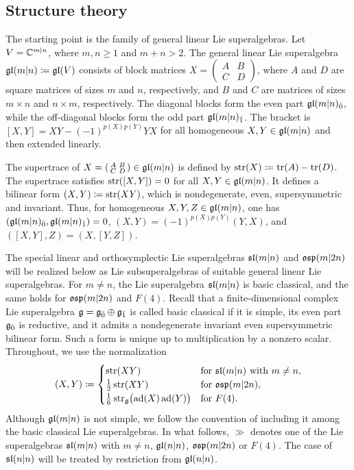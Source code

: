 \subsection{Structure theory}\label{subsec::structure_theory_slmn}
The starting point is the family of general linear Lie superalgebras. Let $V=\CC ^{m\vert n}$, where $m,n\geq1$ and $m+n>2$. The general linear Lie superalgebra $\gl(m\vert n)\coloneqq\gl(V)$ consists of block matrices $X=\left(\begin{smallmatrix}A&B\\ C&D\end{smallmatrix}\right)$, where $A$ and $D$ are square matrices of sizes $m$ and $n$, respectively, and $B$ and $C$ are matrices of sizes $m\times n$ and $n\times m$, respectively. The diagonal blocks form the even part $\gl(m\vert n)_{\bar{0}}$, while the off-diagonal blocks form the odd part $\gl(m\vert n)_{\bar{1}}$. The bracket is $[X,Y]=XY-(-1)^{p(X)p(Y)}YX$ for all homogeneous $X,Y \in \gl(m\vert n)$ and then extended linearly. 

The supertrace of $X=\left(\begin{smallmatrix}A&B\\ C&D\end{smallmatrix}\right)\in \glmn$ is defined by $\str(X)\coloneqq\operatorname{tr}(A)-\operatorname{tr}(D)$. The supertrace satisfies $\str([X,Y])=0$ for all $X,Y\in\gl(m\vert n)$. It defines a bilinear form $(X,Y)\coloneqq\str(XY)$, which is nondegenerate, even, supersymmetric and invariant. Thus, for homogeneous $X,Y,Z\in\gl(m\vert n)$, one has $(\gl(m\vert n)_{\bar0},\gl(m\vert n)_{\bar1})=0$, $(X,Y)=(-1)^{p(X)p(Y)}(Y,X)$, and $([X,Y],Z)=(X,[Y,Z])$.

The special linear and orthosymplectic Lie superalgebras $\sl(m\vert n)$ and $\osp(m\vert 2n)$ will be realized below as Lie subsuperalgebras of suitable general linear Lie superalgebras. For $m\neq n$, the Lie superalgebra $\sl(m\vert n)$ is basic classical, and the same holds for $\osp(m\vert 2n)$ and $F(4)$. Recall that a finite-dimensional complex Lie superalgebra $\gg=\even\oplus\odd$ is called basic classical if it is simple, its even part $\even$ is reductive, and it admits a nondegenerate invariant even supersymmetric bilinear form. Such a form is unique up to multiplication by a nonzero scalar. Throughout, we use the normalization
\begin{equation}\label{eq::supertrace_form}
(X,Y)\coloneqq
\begin{cases}
\str(XY)& \text{for} \ \sl(m\vert n) \ \text{with}\ m\neq n,\\
\frac12\str(XY)& \text{for} \ \osp(m\vert 2n),\\ 
\frac16\str_{\gg}\bigl(\ad(X)\ad(Y)\bigr)& \text{for} \ F(4).
\end{cases}
\end{equation}
Although $\gl(m\vert n)$ is not simple, we follow the convention of including it among the basic classical Lie superalgebras. In what follows, $\gg$ denotes one of the Lie superalgebras $\sl(m\vert n)$ with $m\neq n$, $\gl(n\vert n)$, $\osp(m\vert 2n)$ or $F(4)$. The case of $\sl(n\vert n)$ will be treated by restriction from $\gl(n\vert n)$.

